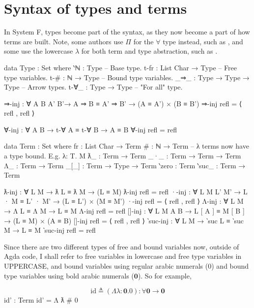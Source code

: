 \documentclass[logo,bsc,singlespacing,parskip,online]{infthesis}
\renewenvironment{code}{\mintedcopy[breaklines,breaksymbolleft=\;]{agda}}{\endmintedcopy}
\begin{document}
\section{Syntax of types and terms}
In System F, types become part of the syntax, as they now become a part of how terms are built.
Note, some authors use $\Pi$ for the $\forall$ type instead, such as \citet{hutton_system_2019}, and
some use the lowercase $\lambda$ for both term and type abstraction, such as
\citet{pierce_types_2002}.

\begin{code}
  data Type : Set where
    ‵ℕ      : Type               -- Base type.
    t-fr     : List Char → Type   -- Free type variables.
    t-#      : ℕ → Type           -- Bound type variables.
    _⇒_      : Type → Type → Type -- Arrow types.
    t-∀_     : Type → Type -- "For all" type.

  ⇒-inj : ∀ {A B A' B'}→ A ⇒ B ≡ A' ⇒ B' → (A ≡ A') × (B ≡ B')
  ⇒-inj refl = ⟨ refl , refl ⟩

  ∀-inj : ∀ {A B}
    → t-∀ A ≡ t-∀ B → A ≡ B
  ∀-inj refl = refl

  data Term : Set where
    fr     : List Char → Term
    #      : ℕ → Term
    -- λ terms now have a type bound. E.g. λ: T. M
    ƛ_     : Term → Term
    _·_    : Term → Term → Term
    Λ_     : Term → Term
    _[_]   : Term → Type → Term
    ‵zero  : Term
    ‵suc_  : Term → Term

  ƛ-inj : ∀ {L M}
    → ƛ L ≡ ƛ M → (L ≡ M)
  ƛ-inj refl = refl
  ·-inj : ∀ {L M L' M'}
    → L · M ≡ L' · M' → (L ≡ L') × (M ≡ M')
  ·-inj refl = ⟨ refl , refl ⟩
  Λ-inj : ∀ {L M}
    → Λ L ≡ Λ M → L ≡ M
  Λ-inj refl = refl
  []-inj : ∀ {L M A B}
    → L [ A ] ≡ M [ B ] → (L ≡ M) × (A ≡ B)
  []-inj refl = ⟨ refl , refl ⟩
  ‵suc-inj : ∀ {L M}
    → ‵suc L ≡ ‵suc M → L ≡ M
  ‵suc-inj refl = refl
\end{code}

Since there are two different types of free and bound variables now, outside of Agda code, I shall
refer to free variables in lowercase and free type variables in UPPERCASE, and bound variables using
regular arabic numerals ($0$) and bound type variables using bold arabic numerals ($\mathbf{0}$). So
for example,

\begin{equation*}
  \text{id} \triangleq (\Lambda \lambda \colon \mathbf{0}. 0) \colon \forall \mathbf{0} \to \mathbf{0}
\end{equation*}
\begin{code}
  id' : Term
  id' = Λ ƛ # 0
\end{code}
\end{document}
